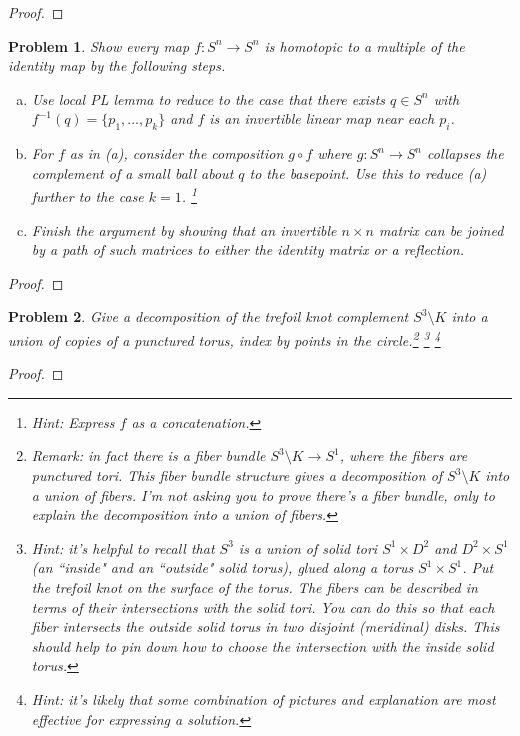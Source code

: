\documentclass[11pt]{article}
\newtheorem{problem}{Problem}
\begin{document}
\begin{proof}

\end{proof}

\pagebreak 

\begin{problem}
Show every map $f:S^n\to S^n$ is homotopic to a multiple of the identity map by the following steps. 
\begin{enumerate}[(a)]
\item Use local PL lemma to reduce to the case that there exists $q\in S^n$ with $f^{-1}(q)=\{p_1,\ldots,p_k\}$ and $f$ is an invertible linear map near each $p_i$. 
\item For $f$ as in (a), consider the composition $g\circ f$ where $g:S^n\to S^n$ collapses the complement of a small ball about $q$ to the basepoint. Use this to reduce (a) further to the case $k=1$. \footnote{Hint: Express $f$ as a concatenation.}
\item Finish the argument by showing that an invertible $n\times n$ matrix can be joined by a path of such matrices to either the identity matrix or a reflection. 
\end{enumerate} 
\end{problem}

\begin{proof}

\end{proof} 

\pagebreak 

\begin{problem}
Give a decomposition of the trefoil knot complement $S^3\setminus K$ into a union of copies of a punctured torus, index by points in the circle.\footnote{Remark: in fact there is a fiber bundle $S^3\setminus K\to S^1$, where the fibers are punctured tori. This fiber bundle structure gives a decomposition of $S^3\setminus K$ into a union of fibers. I'm not asking you to prove there's a fiber bundle, only to explain the decomposition into a union of fibers.} \footnote{Hint: it's helpful to recall that $S^3$ is a union of solid tori $S^1\times D^2$ and $D^2\times S^1$ (an ``inside" and an ``outside" solid torus), glued along a torus $S^1\times S^1$. Put the trefoil knot on the surface of the torus. The fibers can be described in terms of their intersections with the solid tori. You can do this so that each fiber intersects the outside solid torus in two disjoint (meridinal) disks. This should help to pin down how to choose the intersection with the inside solid torus.} 
\footnote{Hint: it's likely that some combination of pictures and explanation are most effective for expressing a solution.}
\end{problem}

\begin{proof}

\end{proof}
\end{document}
